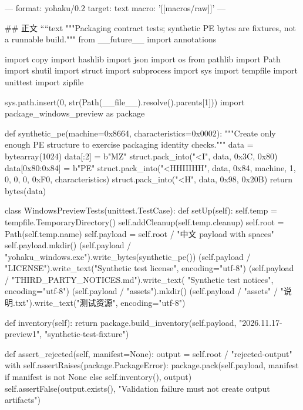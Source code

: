 ---
format: yohaku/0.2
target: text
macro: '[[macros/raw]]'
---

## 正文
````text
"""Packaging contract tests; synthetic PE bytes are fixtures, not a runnable build."""
from __future__ import annotations

import copy
import hashlib
import json
import os
from pathlib import Path
import shutil
import struct
import subprocess
import sys
import tempfile
import unittest
import zipfile

sys.path.insert(0, str(Path(__file__).resolve().parents[1]))
import package_windows_preview as package


def synthetic_pe(machine=0x8664, characteristics=0x0002):
    """Create only enough PE structure to exercise packaging identity checks."""
    data = bytearray(1024)
    data[:2] = b"MZ"
    struct.pack_into("<I", data, 0x3C, 0x80)
    data[0x80:0x84] = b"PE\0\0"
    struct.pack_into("<HHIIIHH", data, 0x84, machine, 1, 0, 0, 0, 0xF0,
                     characteristics)
    struct.pack_into("<H", data, 0x98, 0x20B)
    return bytes(data)


class WindowsPreviewTests(unittest.TestCase):
    def setUp(self):
        self.temp = tempfile.TemporaryDirectory()
        self.addCleanup(self.temp.cleanup)
        self.root = Path(self.temp.name)
        self.payload = self.root / "中文 payload with spaces"
        self.payload.mkdir()
        (self.payload / "yohaku_windows.exe").write_bytes(synthetic_pe())
        (self.payload / "LICENSE").write_text("Synthetic test license\n", encoding="utf-8")
        (self.payload / "THIRD_PARTY_NOTICES.md").write_text(
            "Synthetic test notices\n", encoding="utf-8")
        (self.payload / "assets").mkdir()
        (self.payload / "assets" / "说明.txt").write_text("测试资源\n", encoding="utf-8")

    def inventory(self):
        return package.build_inventory(self.payload, "2026.11.17-preview1", "synthetic-test-fixture")

    def assert_rejected(self, manifest=None):
        output = self.root / "rejected-output"
        with self.assertRaises(package.PackageError):
            package.pack(self.payload, manifest if manifest is not None else self.inventory(), output)
        self.assertFalse(output.exists(), "Validation failure must not create output artifacts")

